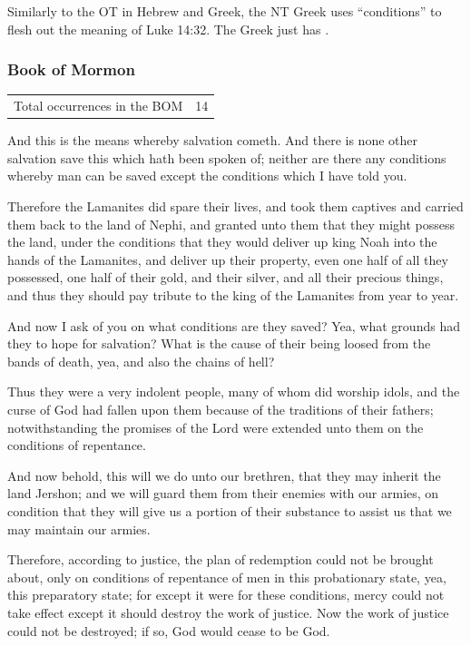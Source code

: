 			Similarly to the OT in Hebrew and Greek, the NT Greek uses ``conditions'' to flesh out the meaning of Luke 14:32. The Greek just has .
		
	\subsubsection{Book of Mormon} %
		\label{CONDITION-BOM}
	
		\begin{tabular}{ll}
			Total occurrences in the BOM & 14
		\end{tabular}
		
		\begin{compactdesc}
			\item[Mosiah 4:8] And this is the means whereby salvation cometh.  And there is none other salvation save this which hath been spoken of; neither are there any conditions whereby man can be saved except the conditions which I have told you.
			\item[Mosiah 19:15] Therefore the Lamanites did spare their lives, and took them captives and carried them back to the land of Nephi, and granted unto them that they might possess the land, under the conditions that they would deliver up king Noah into the hands of the Lamanites, and deliver up their property, even one half of all they possessed, one half of their gold, and their silver, and all their precious things, and thus they should pay tribute to the king of the Lamanites from year to year.
			\item[Alma 5:10] And now I ask of you on what conditions are they saved?  Yea, what grounds had they to hope for salvation?  What is the cause of their being loosed from the bands of death, yea, and also the chains of hell?
			\item[Alma 17:15] Thus they were a very indolent people, many of whom did worship idols, and the curse of God had fallen upon them because of the traditions of their fathers; notwithstanding the promises of the Lord were extended unto them on the conditions of repentance.
			\item[Alma 27:24] And now behold, this will we do unto our brethren, that they may inherit the land Jershon; and we will guard them from their enemies with our armies, on condition that they will give us a portion of their substance to assist us that we may maintain our armies.
			\item[Alma 42:13] Therefore, according to justice, the plan of redemption could not be brought about, only on conditions of repentance of men in this probationary state, yea, this preparatory state; for except it were for these conditions, mercy could not take effect except it should destroy the work of justice.  Now the work of justice could not be destroyed; if so, God would cease to be God.

\end{compactdesc}
